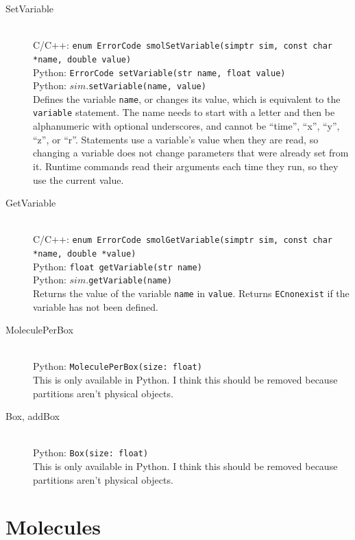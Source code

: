 \documentclass {scrbook}
\newcommand {\ttt} {\texttt}
\begin{document}
\begin{description}
\item[SetVariable]
\hfill \\
C/C++: \ttt{enum ErrorCode smolSetVariable(simptr sim, const char *name, double value)}\\
Python: \ttt{ErrorCode setVariable(str name, float value)}\\
Python: $sim$.\ttt{setVariable(name, value)}\\
Defines the variable \ttt{name}, or changes its value, which is equivalent to the \ttt{variable} statement. The name needs to start with a letter and then be alphanumeric with optional underscores, and cannot be ``time'', ``x'', ``y'', ``z'', or ``r''. Statements use a variable's value when they are read, so changing a variable does not change parameters that were already set from it. Runtime commands read their arguments each time they run, so they use the current value.

\item[GetVariable]
\hfill \\
C/C++: \ttt{enum ErrorCode smolGetVariable(simptr sim, const char *name, double *value)}\\
Python: \ttt{float getVariable(str name)}\\
Python: $sim$.\ttt{getVariable(name)}\\
Returns the value of the variable \ttt{name} in \ttt{value}. Returns \ttt{ECnonexist} if the variable has not been defined.

\item[MoleculePerBox]
\hfill \\
Python: \ttt{MoleculePerBox(size: float)}\\
This is only available in Python. I think this should be removed because partitions aren't physical objects.

\item[Box, addBox]
\hfill \\
Python: \ttt{Box(size: float)}\\
This is only available in Python. I think this should be removed because partitions aren't physical objects.

\end{description}

\section{Molecules}
\end{document}
